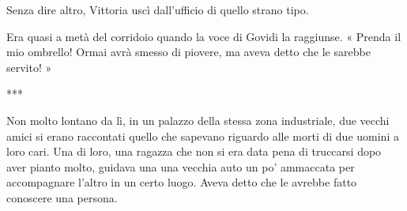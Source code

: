 Senza dire altro, Vittoria uscì dall'ufficio di quello strano tipo.

Era quasi a metà del corridoio quando la voce di Govidi la raggiunse. « Prenda il mio ombrello! Ormai avrà smesso di piovere, ma aveva detto che le sarebbe servito! »

***

Non molto lontano da lì, in un palazzo della stessa zona industriale, due vecchi amici si erano raccontati quello che sapevano riguardo alle morti di due uomini a loro cari. Una di loro, una ragazza che non si era data pena di truccarsi dopo aver pianto molto, guidava una una vecchia auto un po' ammaccata per accompagnare l'altro in un certo luogo. Aveva detto che le avrebbe fatto conoscere una persona.

